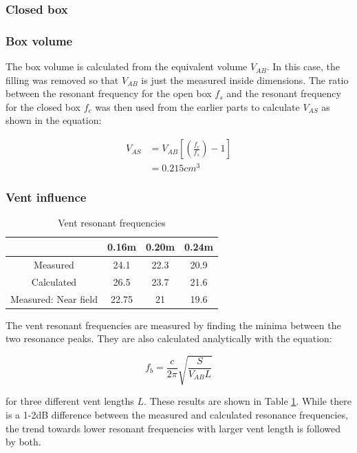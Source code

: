 \documentclass[a4paper,10pt]{article}
\begin{document}
\subsubsection{Closed box}

\subsubsection{Box volume}

The box volume is calculated from the equivalent volume $V_{AB}$. In this case, the filling was removed so that $V_{AB}$ is just the measured inside dimensions. The ratio between the resonant frequency for the open box $f_s$ and the resonant frequency for the closed box $f_c$ was then used from the earlier parts to calculate $V_{AS}$ as shown in the equation:

\begin{align}
    V_{AS} &= V_{AB} [(\frac{f_c}{f_s}) - 1]\\
    & = 0.215 cm^3
    \label{Vas}
\end{align}


\subsubsection{Vent influence}

\begin{table}[H]
    \centering
    \begin{tabular}{c|c|c|c}
         & 0.16m & 0.20m & 0.24m \\
         \hline
        Measured & 24.1 & 22.3 & 20.9\\
        \hline
        Calculated & 26.5 & 23.7 & 21.6\\
        \hline
        Measured: Near field & 22.75 & 21 & 19.6\\
        \hline
    \end{tabular}
    \caption{Vent resonant frequencies}
    \label{tab:ventf}
\end{table}

The vent resonant frequencies are measured by finding the minima between the two resonance peaks. They are also calculated analytically with the equation:

\begin{equation}
    f_b = \frac{c}{2 \pi} \sqrt{\frac{S}{V_{AB} L}}
    \label{eq:ventfrequency}
\end{equation}

for three different vent lengths $L$. These results are shown in Table \ref{tab:ventf}. While there is a 1-2dB difference between the measured and calculated resonance frequencies, the trend towards lower resonant frequencies with larger vent length is followed by both.
\end{document}
